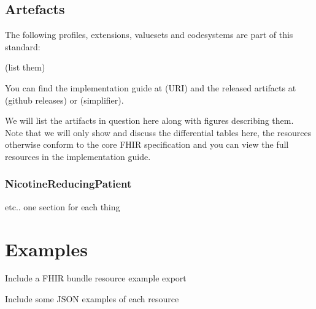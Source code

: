 \documentclass[12px]{report}
\begin{document}
\section{Artefacts}
The following profiles, extensions, valuesets and codesystems are part of this standard:

(list them)

You can find the implementation guide at (URI) and the released artifacts at (github releases) or (simplifier).

We will list the artifacts in question here along with figures describing them. Note that we will only show and discuss the differential tables here, the resources otherwise conform to the core FHIR specification and you can view the full resources in the implementation guide.

\subsection{NicotineReducingPatient}

etc.. one section for each thing

\printbibliography[heading=bibintoc, title={References}]


\appendix

\chapter{Examples}
\label{app:ex}

Include a FHIR bundle resource example export

Include some JSON examples of each resource
\end{document}
